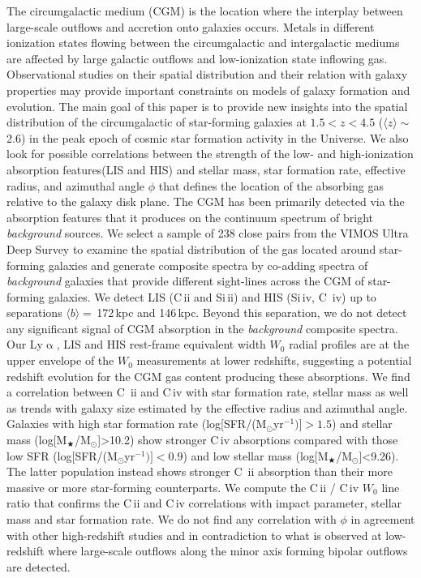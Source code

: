 \documentclass[longauth]{aa}
\begin{document}
   {The circumgalactic medium (CGM) is the location where the interplay
   between large-scale outflows and accretion onto galaxies occurs. Metals in
   different ionization states flowing between the circumgalactic and
   intergalactic mediums are affected by large galactic outflows and
   low-ionization state inflowing gas. Observational studies on their spatial
   distribution and their relation with galaxy properties may provide
   important constraints on models of galaxy formation and evolution.}
   {The main goal of this paper is to provide new insights into the spatial
   distribution of the circumgalactic of star-forming galaxies at $1.5 < z <
   4.5$ ($\langle z\rangle\sim$2.6) in the peak epoch of cosmic
   star formation activity in the Universe. We also look for possible
   correlations between the strength of the low- and high-ionization
   absorption features(LIS and HIS) and stellar mass, star formation rate,
   effective radius, and azimuthal angle $\phi$ that defines the location of
   the absorbing gas relative to the galaxy disk plane.}
   {The CGM has been primarily detected via the absorption features that it
   produces on the continuum spectrum of bright  \textit{background} sources.
   We select a sample of 238 close pairs from the VIMOS Ultra Deep Survey to
   examine the spatial distribution of the gas located around star-forming
   galaxies and generate composite spectra by co-adding spectra of \textit
   {background} galaxies that provide different sight-lines across the CGM of
   star-forming galaxies.}
   {We detect LIS (C\,{\sc ii} and Si\,{\sc ii}) and HIS (Si\,{\sc iv}, C\,
   {\sc iv}) up to separations $\langle b \rangle=$\,172\,kpc and 146\,kpc.
   Beyond this separation, we do not detect any significant
   signal of CGM absorption in the \textit{background} composite spectra. Our
   Ly$\upalpha$, LIS and HIS rest-frame equivalent width $W_{0}$ radial
   profiles are at the upper envelope of the $W_{0}$ measurements at lower
   redshifts, suggesting a potential redshift evolution for the CGM gas
   content producing these absorptions. We find a correlation between C\,
   {\sc ii} and C\,{\sc iv} with star formation rate, stellar mass as well as
   trends with galaxy size estimated by the effective radius and azimuthal
   angle. Galaxies with high star formation rate (log[SFR/(M$_{\odot}$yr$^
   {-1})]>1.5$) and stellar mass (log[M$_{\bigstar}$/M$_{\odot}$]>10.2) show
   stronger C\,{\sc iv} absorptions compared with those low SFR (log[SFR/(M$_
   {\odot}$yr$^{-1})]<0.9$) and low stellar mass (log[M$_{\bigstar}$/M$_
   {\odot}$]<9.26). The latter population instead shows stronger  C\,
   {\sc ii} absorption than their more massive or more star-forming
   counterparts. We compute the C\,{\sc ii} / C\,{\sc iv} $W_{0}$ line ratio
   that confirms the C\,{\sc ii} and C\,{\sc iv} correlations with impact
   parameter, stellar mass and star formation rate. We do not find any
   correlation with $\phi$ in agreement with other high-redshift studies and
   in contradiction to what is observed at low-redshift where  large-scale
   outflows along the minor axis forming bipolar outflows are detected.}
\end{document}
